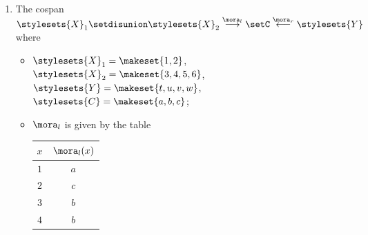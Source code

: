 \begin{gradedexercise}
\begin{enumerate}
              \begin{itemize}
                  \item $\stylesets{X}_1 = \makeset{1, 2}$, $\stylesets{X}_2 = \makeset{3, 4}$, $\stylesets{X}_3 = \makeset{5, 6}$, $\stylesets{Y} = \emptyset$, $\stylesets{C} = \makeset{a, b, c}$;
                  \item $\mora_l$ is given by the table
                        \begin{center}
                            \begin{tabular}{c|c}
                                $x$ & $\mora_l(x)$ \\
                                \hline
                                $1$ & $b$ \\
                                $2$ & $a$ \\
                                $3$ & $a$ \\
                                $4$ & $c$ \\
                                $5$ & $c$ \\
                                $6$ & $b$
                            \end{tabular}
                        \end{center}
              \end{itemize}
        \item The cospan $\stylesets{X}_1 \setdisunion \stylesets{X}_2 \overset{\mora_l}{\longrightarrow} \setC \overset{\mora_r}{\longleftarrow} \stylesets{Y}$ where
              \begin{itemize}
                  \item $\stylesets{X}_1 = \makeset{1, 2}$, $\stylesets{X}_2 = \makeset{3, 4, 5, 6}$, $\stylesets{Y} = \makeset{t, u, v, w}$, $\stylesets{C} = \makeset{a, b, c}$;
                  \item $\mora_l$ is given by the table
                        \begin{center}
                            \begin{tabular}{c|c}
                                $x$ & $\mora_l(x)$ \\
                                \hline
                                $1$ & $a$ \\
                                $2$ & $c$ \\
                                $3$ & $b$ \\
                                $4$ & $b$ \\

\end{tabular}
\end{center}
\end{itemize}
\end{enumerate}
\end{gradedexercise}
